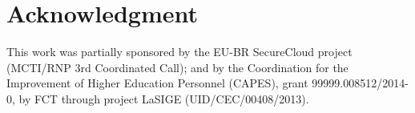 \documentclass[journal]{IEEEtran} %
\begin{document}

\section*{Acknowledgment}
This work was partially sponsored by the EU-BR SecureCloud project (MCTI/RNP 3rd Coordinated Call); and by the Coordination for the Improvement of Higher Education Personnel (CAPES), grant 99999.008512/2014-0, by FCT through project LaSIGE (UID/CEC/00408/2013).


% 
% 
\end{document}
